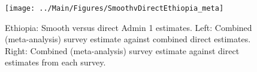 \documentclass[12pt]{article}\usepackage[]{graphicx}\usepackage[]{color}
\newenvironment{knitrout}{}{} %
\begin{document}

\begin{knitrout}
\color{fgcolor}\begin{figure}[bht]

{\centering \texttt{[image: ../Main/Figures/SmoothvDirectEthiopia\_meta]} 

}

\caption[Ethiopia]{Ethiopia: Smooth versus direct Admin 1 estimates. Left: Combined (meta-analysis) survey estimate against combined direct estimates. Right: Combined (meta-analysis) survey estimate against direct estimates from each survey.}\label{fig:unnamed-chunk-113}
\end{figure}


\end{knitrout}
\end{document}
